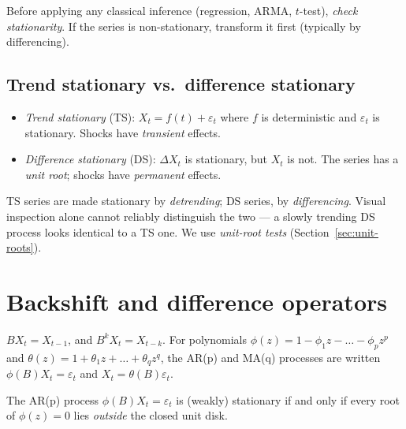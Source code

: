 \begin{rembox}
Before applying any classical inference (regression, ARMA, $t$-test),
\emph{check stationarity}. If the series is non-stationary, transform
it first (typically by differencing).
\end{rembox}

\subsection{Trend stationary vs.\ difference stationary}

\begin{defbox}
\label{def:ts-ds}
\begin{itemize}
  \item \emph{Trend stationary} (TS):
        $X_t = f(t) + \varepsilon_t$ where $f$ is deterministic and
        $\varepsilon_t$ is stationary. Shocks have \emph{transient}
        effects.
  \item \emph{Difference stationary} (DS):
        $\Delta X_t$ is stationary, but $X_t$ is not. The series has
        a \emph{unit root}; shocks have \emph{permanent} effects.
\end{itemize}
\end{defbox}

\begin{rembox}
TS series are made stationary by \emph{detrending}; DS series, by
\emph{differencing}. Visual inspection alone cannot reliably
distinguish the two — a slowly trending DS process looks identical to
a TS one. We use \emph{unit-root tests} (Section~\ref{sec:unit-roots}).
\end{rembox}

\section{Backshift and difference operators}
\label{sec:operators}

\begin{defbox}
\label{def:backshift}
$B X_t = X_{t-1}$, and $B^k X_t = X_{t - k}$.
For polynomials $\phi(z) = 1 - \phi_1 z - \dots - \phi_p z^p$ and
$\theta(z) = 1 + \theta_1 z + \dots + \theta_q z^q$, the AR(p) and
MA(q) processes are written
$\phi(B) X_t = \varepsilon_t$ and $X_t = \theta(B) \varepsilon_t$.
\end{defbox}

\begin{propbox}
\label{prop:ar-stationary}
The AR(p) process $\phi(B) X_t = \varepsilon_t$ is (weakly) stationary
if and only if every root of $\phi(z) = 0$ lies \emph{outside} the
closed unit disk.
\end{propbox}

